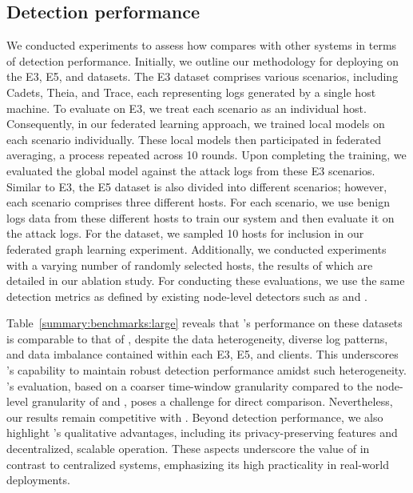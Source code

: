  \subsection{Detection performance}

 We conducted experiments to assess how \Sys compares with other systems in terms of detection performance. Initially, we outline our methodology for deploying \Sys on the \darpa E3, E5, and \optc datasets. The E3 dataset comprises various scenarios, including Cadets, Theia, and Trace, each representing logs generated by a single host machine. To evaluate \Sys on E3, we treat each scenario as an individual host. Consequently, in our federated learning approach, we trained local \gnnshort models on each scenario individually. These local models then participated in federated averaging, a process repeated across 10 rounds. Upon completing the training, we evaluated the global \gnnshort model against the attack logs from these E3 scenarios. Similar to E3, the E5 dataset is also divided into different scenarios; however, each scenario comprises three different hosts. For each scenario, we use benign logs data from these different hosts to train our system and then evaluate it on the attack logs. For the \optc dataset, we sampled 10 hosts for inclusion in our federated graph learning experiment. Additionally, we conducted experiments with a varying number of randomly selected hosts, the results of which are detailed in our ablation study. For conducting these evaluations, we use the same detection metrics as defined by existing node-level detectors such as \threatrace and \flash.

 Table~\ref{summary:benchmarks:large} reveals that \Sys's performance on these datasets is comparable to that of \flash, despite the data heterogeneity, diverse log patterns, and data imbalance contained within each E3, E5, and \optc clients. This underscores \Sys's capability to maintain robust detection performance amidst such heterogeneity. \kairos's evaluation, based on a coarser time-window granularity compared to the node-level granularity of \flash and \Sys, poses a challenge for direct comparison. Nevertheless, our results remain competitive with \kairos. Beyond detection performance, we also highlight \Sys's qualitative advantages, including its privacy-preserving features and decentralized, scalable operation. These aspects underscore the value of \Sys in contrast to centralized systems, emphasizing its high practicality in real-world deployments. 

